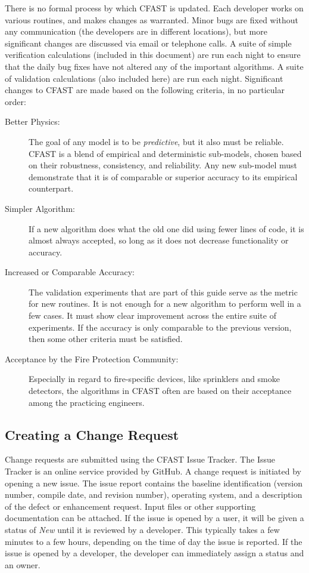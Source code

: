 \documentclass[12pt]{book}
\begin{document}
There is no formal process by which CFAST is updated. Each developer works on various routines, and makes changes as warranted. Minor bugs are fixed without any communication (the developers are in different locations), but more significant changes are discussed via email or telephone calls. A suite of simple verification calculations (included in this document) are run each night to ensure that the daily bug fixes have not altered any of the important algorithms. A suite of validation calculations (also included here) are run each night. Significant changes to CFAST are made based on the following criteria, in no particular order:
\begin{description}
\item[Better Physics:] The goal of any model is to be {\em predictive}, but it also must be reliable. CFAST is a blend of empirical and deterministic sub-models, chosen based on their robustness, consistency, and reliability. Any new sub-model must demonstrate that it is of comparable or superior accuracy to its empirical counterpart.
\item[Simpler Algorithm:] If a new algorithm does what the old one did using fewer lines of code, it is almost always accepted, so long as it does not decrease functionality or accuracy.
\item[Increased or Comparable Accuracy:] The validation experiments that are part of this guide serve as the metric for new routines. It is not enough for a new algorithm to perform well in a few cases. It must show clear improvement across the entire suite of experiments. If the accuracy is only comparable to the previous version, then some other criteria must be satisfied.
\item[Acceptance by the Fire Protection Community:] Especially in regard to fire-specific devices, like sprinklers and smoke detectors, the algorithms in CFAST often are based on their acceptance among the practicing engineers.
\end{description}

\subsection{Creating a Change Request}

Change requests are submitted using the CFAST Issue Tracker.  The Issue Tracker is an online service provided by GitHub. A change request is initiated by opening a new issue.  The issue report contains the baseline identification (version number, compile date, and revision number), operating system, and a description of the defect or enhancement request.  Input files or other supporting documentation can be attached. If the issue is opened by a user, it will be given a status of {\em New} until it is reviewed by a developer. This typically takes a few minutes to a few hours, depending on the time of day the issue is reported. If the issue is opened by a developer, the developer can immediately assign a status and an owner.
\end{document}

